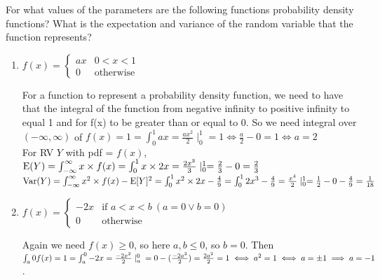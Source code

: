 \question For what values of the parameters are the following functions 
probability density functions? What is the expectation and variance of 
the random variable that the function represents?
\begin{enumerate}[label=(\alph*)]
    \item $f(x) = \begin{cases} ax & 0 < x < 1 \\ 0 & \text{otherwise} 
    \end{cases}$
 	\begin{solution}[5.2cm]
For a function to represent a probability density function, we need to 
have that the integral of the function from negative infinity to positive 
infinity to equal 1 and for f(x) to be greater than or equal to 0. So 
we need integral over $(-\infty, \infty)$ of $f(x) = 1 
= \int_{0}^{1} ax = \frac{ax^2}{2} \mid_{0}^{1} = 1 \iff  \frac{a}{2} - 
0 = 1 \iff a = 2$ \\
For RV $Y$ with pdf = $f(x)$, 
$\text{E}(Y) = \int_{-\infty}^{\infty} x \times f(x) = \int_{0}^{1} x \times 
2x = \frac{2x^3}{3} \mid_{0}^{1} = \frac{2}{3} - 0 = \frac{2}{3}$ \\
$\text{Var}(Y) = \int_{-\infty}^{\infty} x^2 \times f(x)  - \text{E}[Y]^2 = 
\int_{0}^{1} x^2 \times 2x  - \frac{4}{9}= \int_{0}^{1} 2x^3 - 
\frac{4}{9}= \frac{x^4}{2} \mid_{0}^{1} = \frac{1}{2} - 0 -\frac{4}{9} 
= \frac{1}{18}$
	\end{solution}
    
\item $f(x) = \begin{cases} -2x & \text{if } a < x < b\ (a = 0 \lor b 
= 0)\\ 0 & \text{otherwise} \end{cases}$
\begin{solution}[5.2cm]
Again we need $f(x) \ge 0$, so here $a, b \le 0$, so $b=0$.
        Then 
$\int_{a}{0} f(x) = 1 = \int_{a}^{0} -2x = \frac{-2x^2}{2} \mid_{a}^{0}  \\
= 0 - (\frac{-2a^2}{2}) = \frac{2a^2}{2} = 1 \iff a^2 = 1 \iff a \\
= \pm 1 \implies a = -1$. \\


\end{solution}
\end{enumerate}
